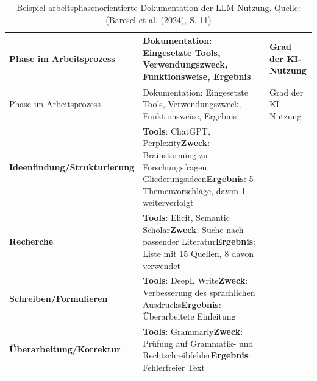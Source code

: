 \documentclass[
  ngerman,
  letterpaper,
  DIV=11]{scrreprt}
\begin{document}
\begin{longtable}[]{@{}
  >{\raggedright\arraybackslash}p{}
  >{\raggedright\arraybackslash}p{}
  >{\raggedright\arraybackslash}p{}@{}}
\caption{Beispiel arbeitsphasenorientierte Dokumentation der LLM
Nutzung. Quelle: (Baresel et al. (2024), S.
11)}\label{tbl-doc-phases}\tabularnewline
\toprule\noalign{}
\begin{minipage}[b]{\linewidth}\raggedright
Phase im Arbeitsprozess
\end{minipage} & \begin{minipage}[b]{\linewidth}\raggedright
Dokumentation: Eingesetzte Tools, Verwendungszweck, Funktionsweise,
Ergebnis
\end{minipage} & \begin{minipage}[b]{\linewidth}\raggedright
Grad der KI-Nutzung
\end{minipage} \\
\midrule\noalign{}
\endfirsthead
\toprule\noalign{}
\begin{minipage}[b]{\linewidth}\raggedright
Phase im Arbeitsprozess
\end{minipage} & \begin{minipage}[b]{\linewidth}\raggedright
Dokumentation: Eingesetzte Tools, Verwendungszweck, Funktionsweise,
Ergebnis
\end{minipage} & \begin{minipage}[b]{\linewidth}\raggedright
Grad der KI-Nutzung
\end{minipage} \\
\midrule\noalign{}
\endhead
\bottomrule\noalign{}
\endlastfoot
\textbf{Ideenfindung/Strukturierung} & \textbf{Tools}: ChatGPT,
Perplexity\textbf{Zweck}: Brainstorming zu Forschungsfragen,
Gliederungsideen\textbf{Ergebnis}: 5 Themenvorschläge, davon 1
weiterverfolgt & 1 \\
\textbf{Recherche} & \textbf{Tools}: Elicit, Semantic
Scholar\textbf{Zweck}: Suche nach passender Literatur\textbf{Ergebnis}:
Liste mit 15 Quellen, 8 davon verwendet & 2 \\
\textbf{Schreiben/Formulieren} & \textbf{Tools}: DeepL
Write\textbf{Zweck}: Verbesserung des sprachlichen
Ausdrucks\textbf{Ergebnis}: Überarbeitete Einleitung & 3 \\
\textbf{Überarbeitung/Korrektur} & \textbf{Tools}:
Grammarly\textbf{Zweck}: Prüfung auf Grammatik- und
Rechtschreibfehler\textbf{Ergebnis}: Fehlerfreier Text & 2 \\
\end{longtable}
\end{document}
